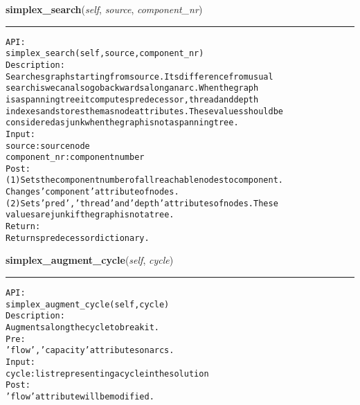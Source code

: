 \hspace{.8\funcindent}\begin{boxedminipage}{\funcwidth}

    \raggedright \textbf{simplex\_search}(\textit{self}, \textit{source}, \textit{component\_nr})

    \vspace{-1.5ex}

    \rule{\textwidth}{0.5\fboxrule}
\setlength{\parskip}{2ex}
\begin{alltt}

API:
    simplex\_search(self, source, component\_nr)
Description:
    Searches graph starting from source. Its difference from usual
    search is we can also go backwards along an arc. When the graph
    is a spanning tree it computes predecessor, thread and depth
    indexes and stores them as node attributes. These values should be
    considered as junk when the graph is not a spanning tree.
Input:
    source: source node
    component\_nr: component number
Post:
    (1) Sets the component number of all reachable nodes to component.
    Changes 'component' attribute of nodes.
    (2) Sets 'pred', 'thread' and 'depth' attributes of nodes. These
    values are junk if the graph is not a tree.
Return:
    Returns predecessor dictionary.
\end{alltt}

\setlength{\parskip}{1ex}
    \end{boxedminipage}

    \label{coinor:gimpy:graph:Graph:simplex_augment_cycle}

    \vspace{0.5ex}

\hspace{.8\funcindent}\begin{boxedminipage}{\funcwidth}

    \raggedright \textbf{simplex\_augment\_cycle}(\textit{self}, \textit{cycle})

    \vspace{-1.5ex}

    \rule{\textwidth}{0.5\fboxrule}
\setlength{\parskip}{2ex}
\begin{alltt}

API:
    simplex\_augment\_cycle(self, cycle)
Description:
    Augments along the cycle to break it.
Pre:
    'flow', 'capacity' attributes on arcs.
Input:
    cycle: list representing a cycle in the solution
Post:
    'flow' attribute will be modified.
\end{alltt}

\setlength{\parskip}{1ex}
    \end{boxedminipage}

